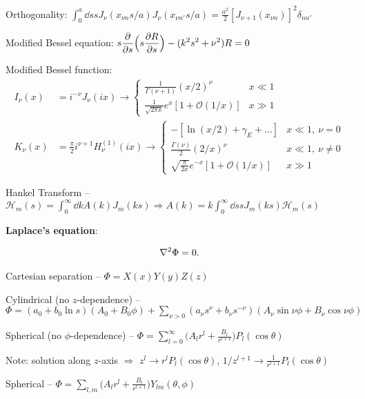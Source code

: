 Orthogonality: $\displaystyle \int_{0}^{a} \dd{s} s J_{\nu}( x_{\nu n} s / a ) J_{\nu}(x_{\nu n'} s / a) = \frac{a^2}{2} [J_{\nu+1}(x_{\nu n})]^2 \delta_{nn'}$

Modified Bessel equation: $\displaystyle s \pdv{s} \Big( s \pdv{R}{s} \Big) - (k^2 s^2 + \nu^2) R = 0$

Modified Bessel function:
\begin{align}
    I_{\nu}(x) &= i^{-\nu} J_{\nu}(ix) \rightarrow \begin{cases}
        \frac{1}{\Gamma(\nu+1)} (x/2)^{\nu} & x \ll 1 \\
        \frac{1}{\sqrt{2 \pi x}} e^{x} [ 1 + \mathcal{O}(1/x) ] & x \gg 1
    \end{cases} \\
        K_{\nu}(x) &= \frac{\pi}{2} i^{\nu+1} H_{\nu}^{(1)}(ix) \rightarrow \begin{cases}
        -[ \ln(x/2) + \gamma_E + \ldots ] & x \ll 1,~\nu = 0 \\
        \frac{\Gamma(\nu)}{2} (2/x)^{\nu} & x \ll 1,~\nu \ne 0 \\
        \sqrt{\frac{\pi}{2x}} e^{-x} [ 1 + \mathcal{O}(1/x) ] & x \gg 1
    \end{cases}
\end{align}

Hankel Transform -- $\displaystyle \mathcal{H}_{m}(s) = \int_{0}^{\infty} \dd{k} A(k) J_{m}(ks) \Rightarrow A(k) = k \int_{0}^{\infty} \dd{s} s J_{m}(ks) \mathcal{H}_{m}(s)$

\textbf{ Laplace's equation}:

\begin{eqnarray}
    \laplacian \Phi = 0
.\end{eqnarray}

Cartesian separation -- $\Phi = X(x) Y(y) Z(z)$

Cylindrical (no $z$-dependence) -- $\displaystyle \Phi = (a_0 + b_0 \ln{s})(A_0 + B_0 \phi) + \sum_{\nu > 0} (a_{\nu} s^{\nu} + b_{\nu} s^{-\nu}) (A_{\nu} \sin{\nu \phi} + B_{\nu} \cos{\nu \phi})$

Spherical (no $\phi$-dependence) -- $\displaystyle \Phi = \sum_{l=0}^{\infty} \Big( A_{l} r^{l} + \frac{B_{l}}{r^{l+1}} \Big) P_{l}(\cos{\theta}) $

Note: solution along $z$-axis $\Rightarrow$ $z^{l} \rightarrow r^{l} P_{l}(\cos{\theta})$, $\displaystyle 1/z^{l+1} \rightarrow \frac{1}{r^{l+1}}P_{l}(\cos{\theta})$

Spherical -- $\displaystyle \Phi = \sum_{l,m} \Big( A_{l} r^{l} + \frac{B_{l}}{r^{l+1}} \Big) Y_{lm}(\theta,\phi)$

